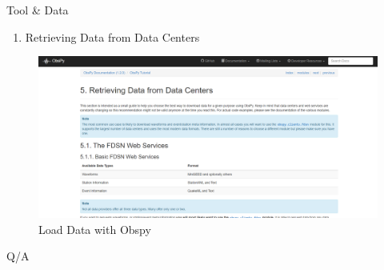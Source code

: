 \documentclass{beamer}
\begin{document}
	\begin{frame}[t]{Tool \& Data}
		\begin{enumerate}
			\item Retrieving Data from Data Centers
		\end{enumerate}
		\begin{figure}
			\includegraphics[scale=0.2]{data.png}
			\caption{Load Data with Obspy}
		\end{figure}
	\end{frame}

	
	\begin{frame}[standout]
		Q/A
	\end{frame}
\end{document}
